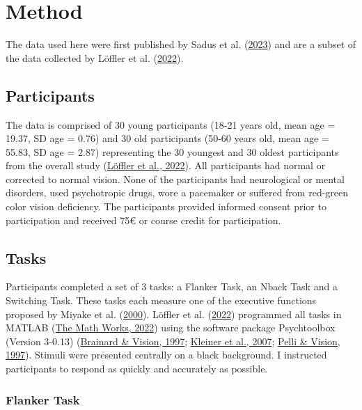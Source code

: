 \documentclass[
  man]{apa7}
\begin{document}
\hypertarget{method}{%
\section{Method}\label{method}}

The data used here were first published by Sadus et al. (\protect\hyperlink{ref-sadus2023multiverse}{2023}) and are a subset of the data collected by Löffler et al. (\protect\hyperlink{ref-loffler2022common}{2022}).

\hypertarget{participants}{%
\subsection{Participants}\label{participants}}

The data is comprised of 30 young participants (18-21 years old, mean age = 19.37, SD age = 0.76) and 30 old participants (50-60 years old, mean age = 55.83, SD age = 2.87) representing the 30 youngest and 30 oldest participants from the overall study (\protect\hyperlink{ref-loffler2022common}{Löffler et al., 2022}). All participants had normal or corrected to normal vision. None of the participants had neurological or mental disorders, used psychotropic drugs, wore a pacemaker or suffered from red-green color vision deficiency. The participants provided informed consent prior to participation and received 75€ or course credit for participation.

\hypertarget{tasks}{%
\subsection{Tasks}\label{tasks}}

Participants completed a set of 3 tasks: a Flanker Task, an Nback Task and a Switching Task. These tasks each measure one of the executive functions proposed by Miyake et al. (\protect\hyperlink{ref-miyake2000unity}{2000}). Löffler et al. (\protect\hyperlink{ref-loffler2022common}{2022}) programmed all tasks in MATLAB (\protect\hyperlink{ref-matlab2022b}{The Math Works, 2022}) using the software package Psychtoolbox (Version 3-0.13) (\protect\hyperlink{ref-brainard1997psychophysics}{Brainard \& Vision, 1997}; \protect\hyperlink{ref-kleiner2007psychtoolbox}{Kleiner et al., 2007}; \protect\hyperlink{ref-pelli1997videotoolbox}{Pelli \& Vision, 1997}). Stimuli were presented centrally on a black background. I instructed participants to respond as quickly and accurately as possible.

\hypertarget{flanker-task}{%
\subsubsection{Flanker Task}\label{flanker-task}}
\end{document}
